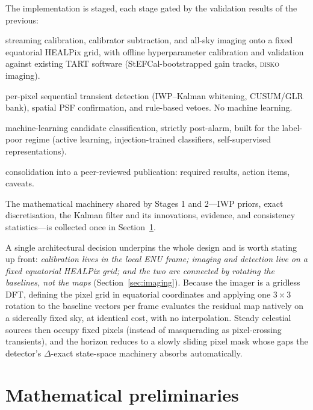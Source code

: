 \documentclass[11pt]{article}
\begin{document}
The implementation is staged, each stage gated by the validation results of the previous:
\begin{description}[leftmargin=*]
  \item[Stage 1 (Section~\ref{sec:stage1}):] streaming calibration, calibrator subtraction, and
    all-sky imaging onto a fixed equatorial HEALPix grid, with offline hyperparameter calibration
    and validation against existing TART software (StEFCal-bootstrapped gain tracks, \textsc{disko}
    imaging).
  \item[Stage 2 (Section~\ref{sec:stage2}):] per-pixel sequential transient detection
    (IWP--Kalman whitening, CUSUM/GLR bank), spatial PSF confirmation, and rule-based vetoes.
    No machine learning.
  \item[Stage 3 (Section~\ref{sec:stage3}):] machine-learning candidate classification, strictly
    post-alarm, built for the label-poor regime (active learning, injection-trained classifiers,
    self-supervised representations).
  \item[Stage 4 (Section~\ref{sec:stage4}):] consolidation into a peer-reviewed publication:
    required results, action items, caveats.
\end{description}
The mathematical machinery shared by Stages 1 and 2---IWP priors, exact discretisation, the Kalman
filter and its innovations, evidence, and consistency statistics---is collected once in
Section~\ref{sec:prelim}.

A single architectural decision underpins the whole design and is worth stating up front:
\emph{calibration lives in the local ENU frame; imaging and detection live on a fixed equatorial
HEALPix grid; and the two are connected by rotating the baselines, not the maps}
(Section~\ref{sec:imaging}). Because the imager is a gridless DFT, defining the pixel grid in
equatorial coordinates and applying one $3\times3$ rotation to the baseline vectors per frame
evaluates the residual map natively on a sidereally fixed sky, at identical cost, with no
interpolation. Steady celestial sources then occupy fixed pixels (instead of masquerading as
pixel-crossing transients), and the horizon reduces to a slowly sliding pixel mask whose gaps the
detector's $\Delta$-exact state-space machinery absorbs automatically.

\section{Mathematical preliminaries}
\label{sec:prelim}
\end{document}
